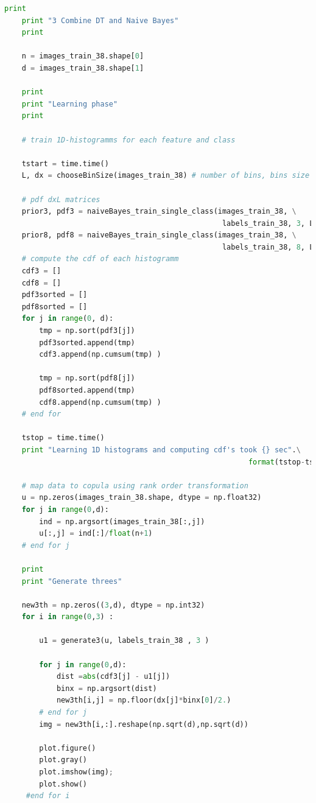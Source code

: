 \documentclass{article}
\begin{document}
\begin{lstlisting}[language=Python]
    print    
    print "3 Combine DT and Naive Bayes"
    print
    
    n = images_train_38.shape[0]
    d = images_train_38.shape[1]

    print    
    print "Learning phase"
    print
    
    # train 1D-histogramms for each feature and class      
    
    tstart = time.time() 
    L, dx = chooseBinSize(images_train_38) # number of bins, bins size
    
    # pdf dxL matrices                  
    prior3, pdf3 = naiveBayes_train_single_class(images_train_38, \
                                                  labels_train_38, 3, L, dx)    
    prior8, pdf8 = naiveBayes_train_single_class(images_train_38, \
                                                  labels_train_38, 8, L, dx)    
    # compute the cdf of each histogramm
    cdf3 = [] 
    cdf8 = []
    pdf3sorted = []
    pdf8sorted = []
    for j in range(0, d):
        tmp = np.sort(pdf3[j])
        pdf3sorted.append(tmp)
        cdf3.append(np.cumsum(tmp) )

        tmp = np.sort(pdf8[j])
        pdf8sorted.append(tmp)        
        cdf8.append(np.cumsum(tmp) )
    # end for                                               

    tstop = time.time()
    print "Learning 1D histograms and computing cdf's took {} sec".\
                                                        format(tstop-tstart)
    
    # map data to copula using rank order transformation
    u = np.zeros(images_train_38.shape, dtype = np.float32)
    for j in range(0,d):
        ind = np.argsort(images_train_38[:,j])
        u[:,j] = ind[:]/float(n+1)
    # end for j    
    
    print
    print "Generate threes"
    
    new3th = np.zeros((3,d), dtype = np.int32)  
    for i in range(0,3) :

        u1 = generate3(u, labels_train_38 , 3 )

        for j in range(0,d):
            dist =abs(cdf3[j] - u1[j])
            binx = np.argsort(dist)
            new3th[i,j] = np.floor(dx[j]*binx[0]/2.)
        # end for j
        img = new3th[i,:].reshape(np.sqrt(d),np.sqrt(d))
        
        plot.figure()
        plot.gray()
        plot.imshow(img);
        plot.show()
     #end for i
\end{lstlisting}    
\end{document}
